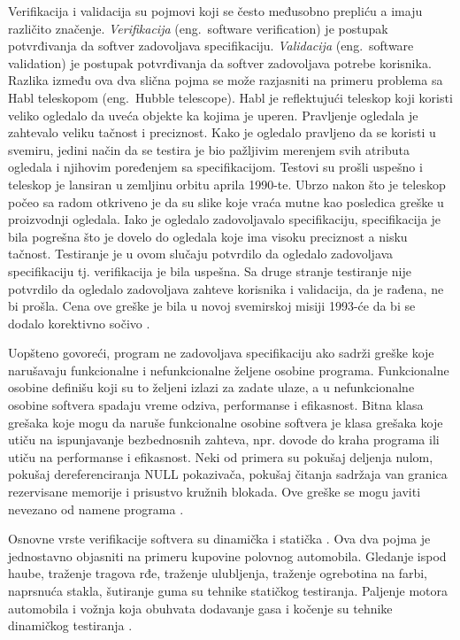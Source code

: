 \documentclass[12pt,oneside]{memoir}
\begin{document}
Verifikacija i validacija su pojmovi koji se često međusobno prepliću a imaju različito značenje. \textit{Verifikacija} (eng.~software verification) je postupak potvrđivanja da softver zadovoljava specifikaciju. \textit{Validacija} (eng.~software validation) je postupak potvrđivanja da softver zadovoljava potrebe korisnika. %
Razlika između ova dva slična pojma se može razjasniti na primeru problema sa Habl teleskopom (eng.~Hubble telescope). Habl je reflektujući teleskop koji koristi veliko ogledalo da uveća objekte ka kojima je uperen. Pravljenje ogledala je zahtevalo veliku tačnost i preciznost. Kako je ogledalo pravljeno da se koristi u svemiru, jedini način da se testira je bio pažljivim merenjem svih atributa ogledala i njihovim poređenjem sa specifikacijom. Testovi su prošli uspešno i teleskop je lansiran u zemljinu orbitu aprila 1990-te. Ubrzo nakon što je teleskop počeo sa radom otkriveno je da su slike koje vraća mutne kao posledica greške u proizvodnji ogledala. Iako je ogledalo zadovoljavalo specifikaciju, specifikacija je bila pogrešna što je dovelo do ogledala koje ima visoku preciznost a nisku tačnost. Testiranje je u ovom slučaju potvrdilo da ogledalo zadovoljava specifikaciju tj. verifikacija je bila uspešna. Sa druge stranje testiranje nije potvrdilo da ogledalo zadovoljava zahteve korisnika i validacija, da je rađena, ne bi prošla. Cena ove greške je bila u novoj svemirskoj misiji 1993-će da bi se dodalo korektivno sočivo \cite{SoftTest}.

Uopšteno govoreći, program ne zadovoljava specifikaciju ako sadrži greške koje narušavaju funkcionalne i nefunkcionalne željene osobine programa. Funkcionalne osobine definišu koji su to željeni izlazi za zadate ulaze, a u nefunkcionalne osobine softvera spadaju vreme odziva, performanse i efikasnost. Bitna klasa grešaka koje mogu da naruše funkcionalne osobine softvera je klasa grešaka koje utiču na ispunjavanje bezbednosnih zahteva, npr. dovode do kraha programa ili utiču na performanse i efikasnost. Neki od primera su pokušaj deljenja nulom, pokušaj dereferenciranja NULL pokazivača, pokušaj čitanja sadržaja van granica rezervisane memorije i prisustvo kružnih blokada. Ove greške se mogu javiti nevezano od namene programa  \cite{mvj}.

Osnovne vrste verifikacije softvera su dinamička i statička  \cite{mvj}. Ova dva pojma je jednostavno objasniti na primeru kupovine polovnog automobila. Gledanje ispod haube, traženje tragova rđe, traženje ulubljenja, traženje ogrebotina na farbi, naprsnuća stakla, šutiranje guma su tehnike statičkog testiranja. Paljenje motora automobila i vožnja koja obuhvata dodavanje gasa i kočenje su tehnike dinamičkog testiranja \cite{SoftTest}.
\end{document}
